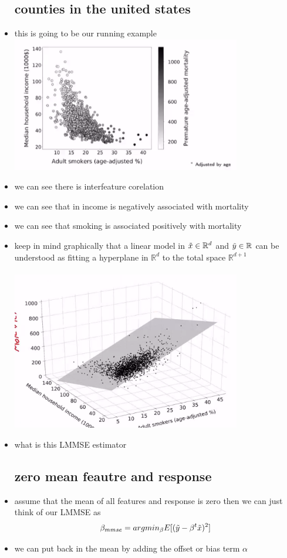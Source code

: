 \documentclass{article}
\begin{document}
\begin{itemize}
\subsection*{counties in the united states }
\item this is going to be our running example \\\includegraphics*[width=10cm]{notes/week_11/immages/w11_2.png}
\item we can see there is interfeature corelation 
\item we can see that in income is negatively associated with mortality 
\item we can see that smoking is associated positively with mortality
\item keep in mind graphically that a linear model in $\Tilde{x}\in \mathbb{R}^{d}$ and $\Tilde{y}\in \mathbb{R}$ 
can be understood as fitting a hyperplane in $\mathbb{R}^d$ to the total space $\mathbb{R}^{d+1}$ \\ \\\includegraphics*[width=10cm]{notes/week_11/immages/w11_3.png}
\item what is this LMMSE estimator
\subsection*{zero mean feautre and response}
\item assume that the mean of all features and response is zero then we can just think of our LMMSE as 
$$\beta_{mmse}=argmin_{\beta}E[(\Tilde{y}-\beta^t\Tilde{x})^2]$$
\item we can put back in the mean by adding the offset or bias term $\alpha$

\end{itemize}
\end{document}
